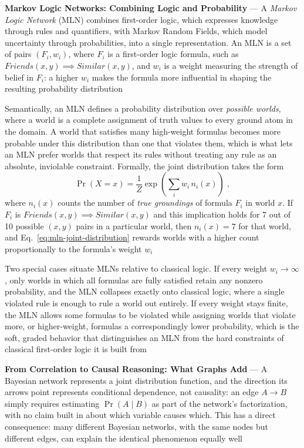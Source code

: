 \textbf{Markov Logic Networks: Combining Logic and Probability} --- A
\emph{Markov Logic Network} (MLN) combines first-order logic, which
expresses knowledge through rules and quantifiers, with Markov Random
Fields, which model uncertainty through probabilities, into a single
representation. An MLN is a set of pairs $(F_i, w_i)$, where $F_i$ is a
first-order logic formula, such as $Friends(x,y) \implies Similar(x,y)$,
and $w_i$ is a weight measuring the strength of belief in $F_i$: a higher
$w_i$ makes the formula more influential in shaping the resulting
probability distribution

Semantically, an MLN defines a probability distribution over
\emph{possible worlds}, where a world is a complete assignment of truth
values to every ground atom in the domain. A world that satisfies many
high-weight formulas becomes more probable under this distribution than
one that violates them, which is what lets an MLN prefer worlds that
respect its rules without treating any rule as an absolute, inviolable
constraint. Formally, the joint distribution takes the form
\begin{equation}
  \label{eq:mln-joint-distribution}
  \Pr(X = x) = \frac{1}{Z} \exp\left(\sum_i w_i\, n_i(x)\right)\;,
\end{equation}
where $n_i(x)$ counts the number of \emph{true groundings} of formula
$F_i$ in world $x$. If $F_i$ is $Friends(x,y) \implies Similar(x,y)$ and
this implication holds for 7 out of 10 possible $(x,y)$ pairs in a
particular world, then $n_i(x) = 7$ for that world, and
Eq.~\eqref{eq:mln-joint-distribution} rewards worlds with a higher count
proportionally to the formula's weight $w_i$

Two special cases situate MLNs relative to classical logic. If every
weight $w_i \to \infty$, only worlds in which all formulas are fully
satisfied retain any nonzero probability, and the MLN collapses exactly
onto classical logic, where a single violated rule is enough to rule a
world out entirely. If every weight stays finite, the MLN allows some
formulas to be violated while assigning worlds that violate more, or
higher-weight, formulas a correspondingly lower probability, which is the
soft, graded behavior that distinguishes an MLN from the hard constraints
of classical first-order logic it is built from

\textbf{From Correlation to Causal Reasoning: What Graphs Add} --- A
Bayesian network represents a joint distribution function, and the
direction its arrows point represents conditional dependence, not
causality: an edge $A \to B$ simply requires estimating $\Pr(A \mid B)$ as
part of the network's factorization, with no claim built in about which
variable causes which. This has a direct consequence: many different
Bayesian networks, with the same nodes but different edges, can explain
the identical phenomenon equally well

